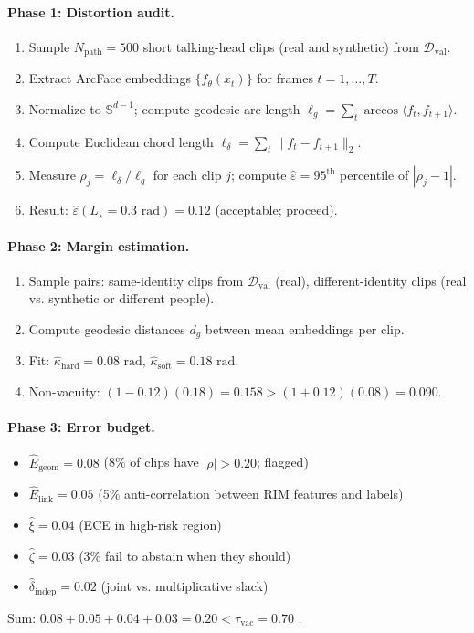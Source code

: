 \documentclass[11pt]{article}
\theoremstyle{remark}
\theoremstyle{plain}
\begin{document}
\paragraph{Phase 1: Distortion audit.}
\begin{enumerate}[label=\arabic*.,leftmargin=*]
  \item Sample $N_{\mathrm{path}} = 500$ short talking-head clips (real and synthetic) from $\mathcal{D}_{\mathrm{val}}$.
  \item Extract ArcFace embeddings $\{f_\theta(x_t)\}$ for frames $t=1,\dots,T$.
  \item Normalize to $\mathbb{S}^{d-1}$; compute geodesic arc length $\ell_g = \sum_t \arccos\langle f_t, f_{t+1}\rangle$.
  \item Compute Euclidean chord length $\ell_\delta = \sum_t \|f_t - f_{t+1}\|_2$.
  \item Measure $\rho_j = \ell_\delta / \ell_g$ for each clip $j$; compute $\hat\varepsilon = 95^{\text{th}}$ percentile of $|\rho_j - 1|$.
  \item Result: $\hat\varepsilon(L_\star=0.3\text{ rad}) = 0.12$ (acceptable; proceed).
\end{enumerate}

\paragraph{Phase 2: Margin estimation.}
\begin{enumerate}[label=\arabic*.,leftmargin=*]
  \item Sample pairs: same-identity clips from $\mathcal{D}_{\mathrm{val}}$ (real), different-identity clips (real vs. synthetic or different people).
  \item Compute geodesic distances $d_g$ between mean embeddings per clip.
  \item Fit: $\hat\kappa_{\mathrm{hard}} = 0.08\text{ rad}$, $\hat\kappa_{\mathrm{soft}} = 0.18\text{ rad}$.
  \item Non-vacuity: $(1-0.12)(0.18) = 0.158 > (1+0.12)(0.08) = 0.090$.
\end{enumerate}

\paragraph{Phase 3: Error budget.}
\begin{itemize}[leftmargin=*]
  \item $\hat E_{\mathrm{geom}} = 0.08$ (8\% of clips have $|\rho| > 0.20$; flagged)
  \item $\hat E_{\mathrm{link}} = 0.05$ (5\% anti-correlation between RIM features and labels)
  \item $\hat\xi = 0.04$ (ECE in high-risk region)
  \item $\hat\zeta = 0.03$ (3\% fail to abstain when they should)
  \item $\hat\delta_{\mathrm{indep}} = 0.02$ (joint vs. multiplicative slack)
\end{itemize}
Sum: $0.08 + 0.05 + 0.04 + 0.03 = 0.20 < \tau_{\mathrm{vac}} = 0.70$ .
\end{document}
